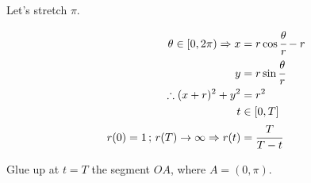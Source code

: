 \documentclass[12pt]{article}
\begin{document}
Let's stretch $\pi$.

\begin{align}
  \theta \in [0, 2\pi) \Rightarrow x &= r \cos \cfrac{\theta}{r} - r \\
  y &= r \sin \cfrac{\theta}{r}\\
  \therefore (x + r)^2 + y^2 &= r^2\\
  t &\in [0, T]\\
  r(0) = 1 \,;\, r(T) \to \infty \Rightarrow r(t) &= \cfrac{T}{T - t}
\end{align}

Glue up at $t = T$ the segment $OA$, where $A = (0, \pi)$.
\end{document}
